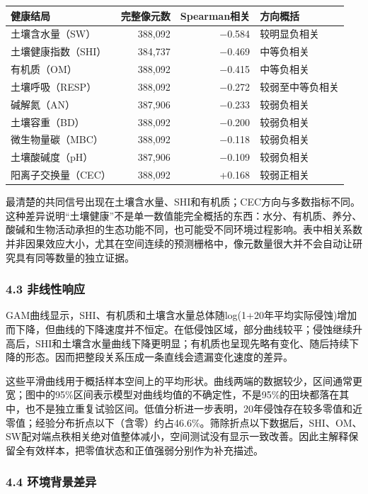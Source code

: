 \documentclass[
  10.5pt,
]{article}
\begin{document}
\begin{longtable}[]{@{}lrrl@{}}
\toprule
健康结局 & 完整像元数 & Spearman相关 & 方向概括 \\
\midrule
\endhead
土壤含水量（SW） & 388,092 & −0.584 & 较明显负相关 \\
土壤健康指数（SHI） & 384,737 & −0.469 & 中等负相关 \\
有机质（OM） & 388,092 & −0.415 & 中等负相关 \\
土壤呼吸（RESP） & 388,092 & −0.272 & 较弱至中等负相关 \\
碱解氮（AN） & 387,906 & −0.233 & 较弱负相关 \\
土壤容重（BD） & 388,092 & −0.200 & 较弱负相关 \\
微生物量碳（MBC） & 388,092 & −0.118 & 较弱负相关 \\
土壤酸碱度（pH） & 387,906 & −0.109 & 较弱负相关 \\
阳离子交换量（CEC） & 388,092 & +0.168 & 较弱正相关 \\
\bottomrule
\end{longtable}

最清楚的共同信号出现在土壤含水量、SHI和有机质；CEC方向与多数指标不同。这种差异说明``土壤健康''不是单一数值能完全概括的东西：水分、有机质、养分、酸碱和生物活动承担的生态功能不同，也可能受不同环境过程影响。表中相关系数并非因果效应大小，尤其在空间连续的预测栅格中，像元数量很大并不会自动让研究具有同等数量的独立证据。

\hypertarget{ux975eux7ebfux6027ux54cdux5e94}{%
\subsubsection{4.3 非线性响应}\label{ux975eux7ebfux6027ux54cdux5e94}}

GAM曲线显示，SHI、有机质和土壤含水量总体随log(1+20年平均实际侵蚀)增加而下降，但曲线的下降速度并不恒定。在低侵蚀区域，部分曲线较平；侵蚀继续升高后，SHI和土壤含水量曲线下降更明显；有机质也呈现先略有变化、随后持续下降的形态。因而把整段关系压成一条直线会遗漏变化速度的差异。

这些平滑曲线用于概括样本空间上的平均形状。曲线两端的数据较少，区间通常更宽；图中的95\%区间表示模型对曲线均值的不确定性，不是95\%的田块都落在其中，也不是独立重复试验区间。低值分析进一步表明，20年侵蚀存在较多零值和近零值；经验分布折点以下（含零）约占46.6\%。筛除折点以下数据后，SHI、OM、SW配对端点秩相关绝对值整体减小，空间测试没有显示一致改善。因此主解释保留全有效样本，把零值状态和正值强弱分别作为补充描述。

\hypertarget{ux73afux5883ux80ccux666fux5deeux5f02}{%
\subsubsection{4.4
环境背景差异}\label{ux73afux5883ux80ccux666fux5deeux5f02}}
\end{document}
